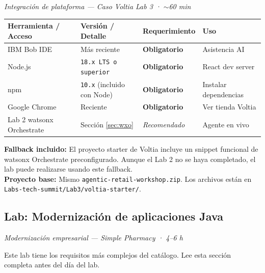 \documentclass[11pt, a4paper]{article}
\newcommand{\version}[1]{\texttt{\textcolor{ibmblue}{#1}}}
\newcommand{\req}[1]{\textbf{\textcolor{ibmred}{#1}}}
\newcommand{\optional}[1]{\textit{\textcolor{ibmgray}{#1}}}
\begin{document}
\textit{Integración de plataforma — Caso Voltia Lab 3 · $\sim$60 min}

\vspace{4pt}
\begin{tabular}{@{}llll@{}}
\toprule
\textbf{Herramienta / Acceso} & \textbf{Versión / Detalle} & \textbf{Requerimiento} & \textbf{Uso} \\
\midrule
IBM Bob IDE & Más reciente & \req{Obligatorio} & Asistencia AI \\
Node.js & \version{18.x LTS o superior} & \req{Obligatorio} & React dev server \\
npm & \version{10.x} (incluido con Node) & \req{Obligatorio} & Instalar dependencias \\
Google Chrome & Reciente & \req{Obligatorio} & Ver tienda Voltia \\
Lab 2 watsonx Orchestrate & Sección \ref{sec:wxo} & \optional{Recomendado} & Agente en vivo \\
\bottomrule
\end{tabular}

\vspace{10pt}
\begin{infobox}
  \textbf{Fallback incluido:} El proyecto starter de Voltia incluye un snippet funcional de watsonx Orchestrate preconfigurado. Aunque el Lab 2 no se haya completado, el lab puede realizarse usando este fallback. \\[4pt]
  \textbf{Proyecto base:} Mismo \texttt{agentic-retail-workshop.zip}. Los archivos están en \texttt{Labs-tech-summit/Lab3/voltia-starter/}.
\end{infobox}

\subsection{Lab: Modernización de aplicaciones Java}
\label{sec:java}

\textit{Modernización empresarial — Simple Pharmacy · 4--6 h}

\vspace{4pt}
Este lab tiene los requisitos más complejos del catálogo. Lee esta sección completa antes del día del lab.
\end{document}
